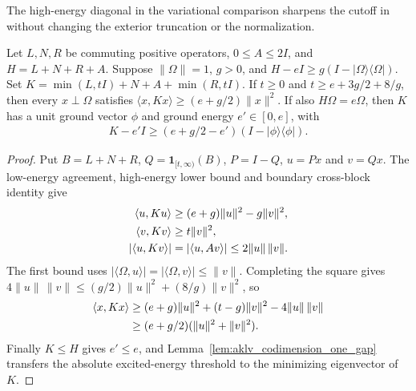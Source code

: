 The high-energy diagonal in the variational comparison sharpens the cutoff
in \cite[Theorem~6.1]{Arad2013AreaLaw} without changing the exterior
truncation or the normalization.

\begin{lemma}
    \label{lem:aklv_inverse_gap_comparison}
    \leanok
    Let $L,N,R$ be commuting positive operators, $0\le A\le2I$, and
    $H=L+N+R+A$. Suppose $\|\Omega\|=1$, $g>0$, and
    $H-eI\ge g(I-|\Omega\rangle\langle\Omega|)$. Set
    $K=\min(L,tI)+N+A+\min(R,tI)$. If $t\ge0$ and
    $t\ge e+3g/2+8/g$, then every $x\perp\Omega$ satisfies
    $\langle x,Kx\rangle\ge(e+g/2)\|x\|^2$.
    If also $H\Omega=e\Omega$, then $K$ has a unit ground vector
    $\phi$ and ground energy $e'\in[0,e]$, with
    \begin{align}
        K-e'I\ge(e+g/2-e')(I-|\phi\rangle\langle\phi|).
    \end{align}
\end{lemma}
\begin{proof}\leanok
    Put $B=L+N+R$, $Q=\mathbf1_{[t,\infty)}(B)$, $P=I-Q$,
    $u=Px$ and $v=Qx$. The low-energy agreement, high-energy lower bound
    and boundary cross-block identity give
    \begin{align}
        \langle u,Ku\rangle
         & \ge(e+g)\|u\|^2-g\|v\|^2,\notag         \\
        \langle v,Kv\rangle
         & \ge t\|v\|^2,\notag                     \\
        |\langle u,Kv\rangle|
         & =|\langle u,Av\rangle|\le2\|u\|\,\|v\|.
    \end{align}
    The first bound uses
    $|\langle\Omega,u\rangle|=|\langle\Omega,v\rangle|\le\|v\|$.
    Completing the square gives
    $4\|u\|\,\|v\|\le(g/2)\|u\|^2+(8/g)\|v\|^2$, so
    \begin{align}
        \langle x,Kx\rangle
         & \ge(e+g)\|u\|^2+(t-g)\|v\|^2-4\|u\|\,\|v\|\notag \\
         & \ge(e+g/2)(\|u\|^2+\|v\|^2).
    \end{align}
    Finally $K\le H$ gives $e'\le e$, and
    Lemma~\ref{lem:aklv_codimension_one_gap} transfers the absolute
    excited-energy threshold to the minimizing eigenvector of $K$.
\end{proof}

